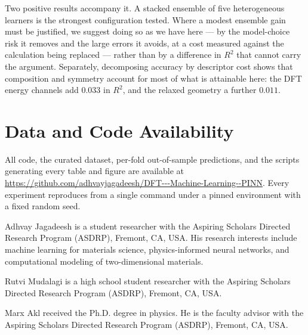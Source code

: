 \documentclass{ieeeaccess}
\begin{document}
Two positive results accompany it. A stacked ensemble of five heterogeneous learners is the strongest configuration tested. Where a modest ensemble gain must be justified, we suggest doing so as we have here --- by the model-choice risk it removes and the large errors it avoids, at a cost measured against the calculation being replaced --- rather than by a difference in $R^2$ that cannot carry the argument. Separately, decomposing accuracy by descriptor cost shows that composition and symmetry account for most of what is attainable here: the DFT energy channels add $0.033$ in $R^2$, and the relaxed geometry a further $0.011$.

\section*{Data and Code Availability}
All code, the curated dataset, per-fold out-of-sample predictions, and the scripts generating every table and figure are available at \url{https://github.com/adhvayjagadeesh/DFT---Machine-Learning--PINN}. Every experiment reproduces from a single command under a pinned environment with a fixed random seed.




\begin{IEEEbiographynophoto}{Adhvay Jagadeesh}
is a student researcher with the Aspiring Scholars Directed Research Program (ASDRP), Fremont, CA, USA. His research interests include machine learning for materials science, physics-informed neural networks, and computational modeling of two-dimensional materials.
\end{IEEEbiographynophoto}

\begin{IEEEbiographynophoto}{Rutvi Mudalagi}
is a high school student researcher with the Aspiring Scholars Directed Research Program (ASDRP), Fremont, CA, USA.
\end{IEEEbiographynophoto}

\begin{IEEEbiographynophoto}{Marx Akl}
received the Ph.D. degree in physics. He is the faculty advisor with the Aspiring Scholars Directed Research Program (ASDRP), Fremont, CA, USA.
\end{IEEEbiographynophoto}

\EOD
\end{document}
